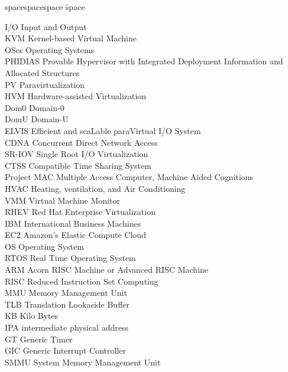 
\begin{tabbing}
spacespacespace \= space \kill

I/O   \> Input and Output \\
KVM   \> Kernel-based Virtual Machine \\
OSes  \> Operating Systems \\
PHIDIAS	 \> Provable Hypervisor with Integrated Deployment Information and Allocated Structures	 \\
PV 	 \> Paravirtualization 	 \\
HVM	 \>  Hardware-assisted Virtualization \\
Dom0	 \> Domain-0 \\
DomU	 \>  Domain-U	 \\
ELVIS  \> Efficient and scaLable paraVirtual I/O System \\
CDNA    \> Concurrent Direct Network Access \\
SR-IOV  \> Single Root I/O Virtualization  \\
CTSS   \> Compatible Time Sharing System \\
Project MAC \>  Multiple Access Computer, Machine Aided Cognitions \\
HVAC   \>  Heating, ventilation, and Air Conditioning \\
VMM  \> Virtual Machine Monitor \\
RHEV  \> Red Hat Enterprise Virtualization \\
IBM     \>  International Business Machines  \\
EC2 \> Amazon's Elastic Compute Cloud    \\
OS  \> Operating System \\
RTOS     \>  Real Time Operating System     \\
ARM \>  Acorn RISC Machine  or Advanced RISC Machine   \\
RISC     \>   Reduced Instruction Set Computing    \\
MMU  \> Memory Management Unit \\
TLB  \> Translation Lookaside Buffer \\
KB   \> Kilo Bytes \\
IPA  \> intermediate physical address \\
GT  \> Generic Timer \\
GIC  \> Generic Interrupt Controller \\
SMMU  \> System Memory Management Unit \\
\end{tabbing}
\endinput
